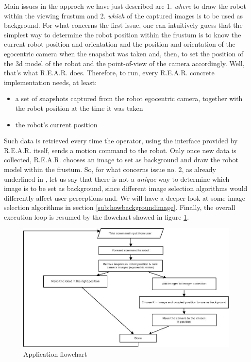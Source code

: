 %
Main issues in the approch we have just described are 1. 
\textit{where} to draw the robot within the viewing frustum 
and 2. \textit{which} of the captured images is to be used 
as background.
%
For what concerns the first issue, one can intuitively guess 
that the simplest way to determine the robot position 
within the frustum is to know the current robot position 
and orientation and the position and orientation of the egocentric 
camera when the snapshot was taken and, then, to set the 
position of the 3d model of the robot and the point-of-view 
of the camera accordingly.
Well, that's what \textsf{R.E.A.R.} does.
%
Therefore, to run, every \textsf{R.E.A.R.} concrete implementation 
needs, at least:
%
\begin{itemize}
  \item a set of snapshots captured from the robot egocentric camera, 
    together with the robot position at the time it was taken
  \item the robot's current position
\end{itemize}
%
Such data is retrieved every time the operator, using the 
interface provided by \textsf{R.E.A.R.} itself, sends a 
motion command to the robot.
%
Only once new data is collected, \textsf{R.E.A.R.} chooses 
an image to set as background and draw the robot model within 
the frustum. So, for what concerns issue no. 2, as already 
underlined in \cite{sugimoto}, let us say that there is not 
a \textit{unique} way to determine which image is to be set 
as background, since different image selection algorithms 
would differently affect user perceptions and. We will have a 
deeper look at some image selection algorithms in section
\ref{sub:howbackgroundimage}.
%
Finally, the overall execution loop is resumed by the flowchart 
showed in figure \ref{fig:overall_diagram}.
%
\begin{figure}[!h]
  \begin{center}
    \includegraphics[width=350pt]{img/overall_diagram.jpeg}  %
    \caption{Application flowchart}
    \label{fig:overall_diagram}
  \end{center}
\end{figure}
